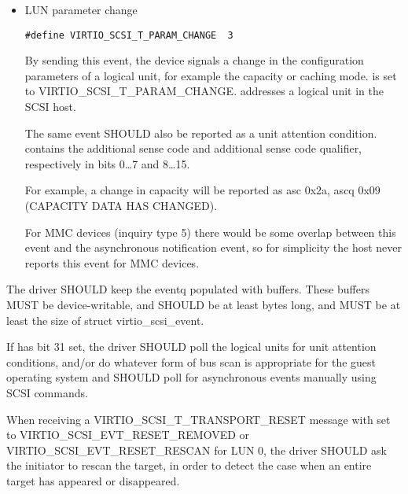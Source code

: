 \begin{itemize}
  \item LUN parameter change
\begin{lstlisting}
#define VIRTIO_SCSI_T_PARAM_CHANGE  3
\end{lstlisting}

  By sending this event, the device signals a change in the configuration parameters
  of a logical unit, for example the capacity or caching mode.
   is set to VIRTIO_SCSI_T_PARAM_CHANGE.
   addresses a logical unit in the SCSI host.

  The same event SHOULD also be reported as a unit attention condition.
   contains the additional sense code and additional sense code qualifier,
  respectively in bits 0\ldots 7 and 8\ldots 15.
  \begin{note}
  For example, a change in capacity will be reported as asc 0x2a, ascq 0x09
  (CAPACITY DATA HAS CHANGED).
  \end{note}

  For MMC devices (inquiry type 5) there would be some overlap between this
  event and the asynchronous notification event, so for simplicity the host never
  reports this event for MMC devices.
\end{itemize}


The driver SHOULD keep the eventq populated with buffers.  These
buffers MUST be device-writable, and SHOULD be at least
 bytes long, and MUST be at least the size of
struct virtio_scsi_event.

If  has bit 31 set, the driver SHOULD
poll the logical units for unit attention conditions, and/or do
whatever form of bus scan is appropriate for the guest operating
system and SHOULD poll for asynchronous events manually using SCSI commands.

When receiving a VIRTIO_SCSI_T_TRANSPORT_RESET message with
 set to VIRTIO_SCSI_EVT_RESET_REMOVED or
VIRTIO_SCSI_EVT_RESET_RESCAN for LUN 0, the driver SHOULD ask the
initiator to rescan the target, in order to detect the case when an
entire target has appeared or disappeared.


